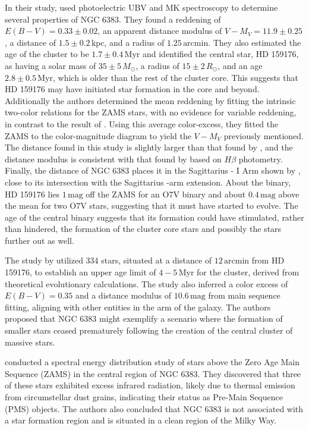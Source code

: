 \documentclass[fleqn,usenatbib,usedcolumn,useAMS]{mnras}
\begin{document}
In their study, \citet{1978MNRAS.182..607F} used photoelectric UBV and MK spectroscopy to determine several properties of NGC 6383. They found a reddening of $E(B-V) = 0.33 \pm 0.02$, an apparent distance modulus of $V-M_V = 11.9 \pm 0.25$, a distance of $1.5 \pm 0.2 \,\textrm{kpc}$, and a radius of $1.25 \,\textrm{arcmin}$. They also estimated the age of the cluster to be $1.7 \pm 0.4\,\textrm{Myr}$ and identified the central star, HD 159176, as having a solar mass of $35 \pm 5\,M_\odot$, a radius of $15 \pm 2\,R_\odot$, and an age $2.8 \pm 0.5\,\textrm{Myr}$, which is older than the rest of the cluster core. This suggests that HD 159176 may have initiated star formation in the core and beyond. Additionally the authors determined the mean reddening by fitting the intrinsic two-color relations for the ZAMS stars, with no evidence for variable reddening, in contrast to the result of \citet{1972BAICz..23..126A}. Using this average color-excess, they fitted the ZAMS to the color-magnitude diagram to yield the $V-M_V$ previously mentioned. The distance found in this study is slightly larger than that found by \citet{1965AJ.....70...19E}, and the distance modulus is consistent with that found by \citet{1967MNRAS.135..377G} based on $H\beta$ photometry. Finally, the distance of NGC 6383 places it in the Sagittarius - I Arm shown by \citet{1975A&A....39..477V}, close to its intersection with the Sagittarius -arm extension. About the binary, HD 159176 lies $1\,\textrm{mag}$ off the ZAMS for an O7V binary and about $0.4\,\textrm{mag}$ above the mean for two O7V stars, suggesting that it must have started to evolve. The age of the central binary suggests that its formation could have stimulated, rather than hindered, the formation of the cluster core stars and possibly the stars further out as well.

The study by \citet{1978MNRAS.184..661L} utilized 334 stars, situated at a distance of $12\,\textrm{arcmin}$ from HD 159176, to establish an upper age limit of $4-5\,\textrm{Myr}$ for the cluster, derived from theoretical evolutionary calculations. The study also inferred a color excess of $E(B-V) = 0.35$ and a distance modulus of $10.6\,\textrm{mag}$ from main sequence fitting, aligning with other entities in the arm of the galaxy. The authors proposed that NGC 6383 might exemplify a scenario where the formation of smaller stars ceased prematurely following the creation of the central cluster of massive stars.

\citet{1985A&A...151..391T} conducted a spectral energy distribution study of stars above the Zero Age Main Sequence (ZAMS) in the central region of NGC 6383. They discovered that three of these stars exhibited excess infrared radiation, likely due to thermal emission from circumstellar dust grains, indicating their status as Pre-Main Sequence (PMS) objects. The authors also concluded that NGC 6383 is not associated with a star formation region and is situated in a clean region of the Milky Way.
\end{document}
